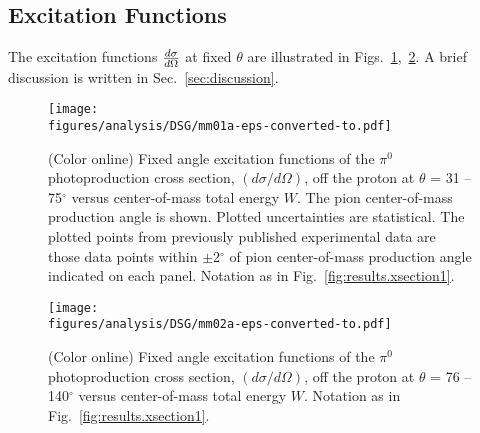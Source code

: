 \subsection{Excitation Functions}
\label{ExtFun}
The excitation functions $\frac{\lowercase{d}\sigma}{\lowercase{d}\Omega}$ at fixed $\theta$ are illustrated in Figs.~\ref{fig:wdist},~\ref{fig:wdist2}. A brief discussion is written in Sec.~\ref{sec:discussion}.
\begin{figure}[h!]\begin{center}
\texttt{[image: \\figures/analysis/DSG/mm01a-eps-converted-to.pdf]}
\caption[Fixed angle excitation functions of the $\pi^0$ photoproduction cross section, $(d\sigma/d\Omega)$, off the proton at $\theta$ = 31 -- 75$^\circ$ versus center-of-mass total energy $W$]{\label{fig:wdist}(Color online) Fixed angle excitation functions of the $\pi^0$ photoproduction cross section, $(d\sigma/d\Omega)$, off the proton at $\theta$ = 31 -- 75$^\circ$ versus center-of-mass total energy $W$. The pion center-of-mass production angle is shown. Plotted uncertainties are statistical. The plotted points from previously published experimental data are those data points within $\pm$2$^\circ$ of pion center-of-mass production angle indicated on each panel. Notation as in Fig.~\protect\ref{fig:results.xsection1}.}
\end{center}\end{figure}


\begin{figure}[h!]\begin{center}
\texttt{[image: \\figures/analysis/DSG/mm02a-eps-converted-to.pdf]}
\caption[Fixed angle excitation functions of the $\pi^0$ photoproduction cross section, $(d\sigma/d\Omega)$, off the proton at $\theta$ = 76 -- 140$^\circ$ versus center-of-mass total energy $W$]{\label{fig:wdist2}(Color online) Fixed angle excitation functions of the $\pi^0$ photoproduction cross section, $(d\sigma/d\Omega)$, off the proton at $\theta$ = 76 -- 140$^\circ$ versus center-of-mass total energy $W$. Notation as in Fig.~\protect\ref{fig:results.xsection1}.}
\end{center}\end{figure}


\FloatBarrier
\clearpage
